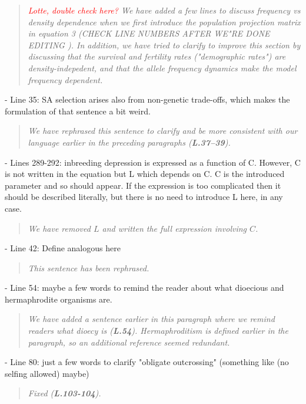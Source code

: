 \documentclass[11pt]{article}
\begin{document}
\begin{quote}
	{\itshape \textcolor{red}{Lotte, double check here?} We have added a few lines to discuss frequency vs density dependence when we first introduce the population projection matrix in equation 3 (CHECK LINE NUMBERS AFTER WE"RE DONE EDITING ). In addition, we have tried to clarify to improve this section by discussing that the survival and fertility rates ("demographic rates") are density-indepedent, and that the allele frequency dynamics make the model frequency dependent.}
\end{quote}

- Line 35: SA selection arises also from non-genetic trade-offs, which makes the formulation of that sentence a bit weird.

\begin{quote}
	{\itshape We have rephrased this sentence to clarify and be more consistent with our language earlier in the preceding paragraphs ({\bf L.37--39}).}
\end{quote}

- Lines 289-292: inbreeding depression is expressed as a function of C. However, C is not written in the equation but L which depends on C. C is the introduced parameter and so should appear. If the expression is too complicated then it should be described literally, but there is no need to introduce L here, in any case.

\begin{quote}
	{\itshape We have removed $L$ and written the full expression involving $C$.}
\end{quote}

- Line 42: Define analogous here

\begin{quote}
	{\itshape This sentence has been rephrased.}
\end{quote}

- Line 54: maybe a few words to remind the reader about what dioecious and hermaphrodite organisms are.

\begin{quote}
	{\itshape We have added a sentence earlier in this paragraph where we remind readers what dioecy is ({\bf L.54}). Hermaphroditism is defined earlier in the paragraph, so an additional reference seemed redundant.}
\end{quote}

- Line 80: just a few words to clarify "obligate outcrossing" (something like (no selfing allowed) maybe)

\begin{quote}
	{\itshape Fixed ({\bf L.103-104}).}
\end{quote}
\end{document}
